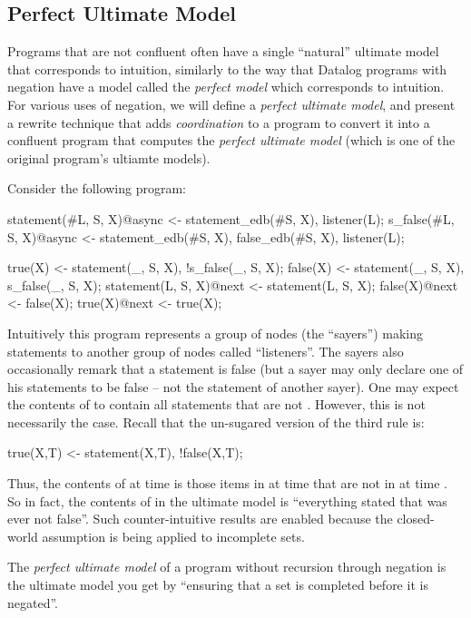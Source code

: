 \subsection{Perfect Ultimate Model}
Programs that are not confluent often have a single ``natural'' ultimate model that corresponds to intuition, similarly to the way that Datalog programs with negation have a model called the {\em perfect model} which corresponds to intuition.  For various uses of negation, we will define a {\em perfect ultimate model}, and present a rewrite technique that adds {\em coordination} to a \lang program to convert it into a confluent \lang program that computes the {\em perfect ultimate model} (which is one of the original program's ultiamte models).

Consider the following program:

\begin{Dedalus}
statement(#L, S, X)@async <- statement_edb(#S, X), listener(L);
s_false(#L, S, X)@async <- statement_edb(#S, X), false_edb(#S, X), listener(L);

true(X) <- statement(_, S, X), !s_false(_, S, X);
false(X) <- statement(_, S, X), s_false(_, S, X);
statement(L, S, X)@next <- statement(L, S, X);
false(X)@next <- false(X);
true(X)@next <- true(X);
\end{Dedalus}

Intuitively this program represents a group of nodes (the ``sayers'') making statements to another group of nodes called ``listeners''.  The sayers also occasionally remark that a statement is false (but a sayer may only declare one of his statements to be false -- not the statement of another sayer).  One may expect the contents of  to contain all statements that are not .  However, this is not necessarily the case.  Recall that the un-sugared version of the third rule is:

\begin{Dedalus}
true(X,T) <- statement(X,T), !false(X,T);
\end{Dedalus}

Thus, the contents of  at time  is those items in  at time  that are not in  at time .  So in fact, the contents of  in the ultimate model is ``everything stated that was ever not false''.  Such counter-intuitive results are enabled because the closed-world assumption is being applied to incomplete sets.

\begin{definition}
The {\em perfect ultimate model} of a \lang program without recursion through negation is the ultimate model you get by ``ensuring that a set is completed before it is negated''. 
\end{definition}

